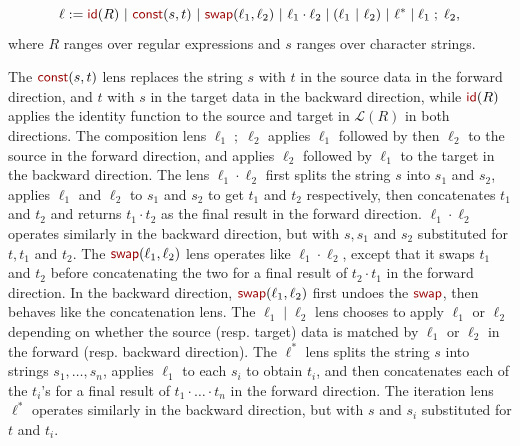 \documentclass[acmsmall,review,anonymous]{acmart}
\newcommand{\kw}[1]{\textcolor{dkred}{\ensuremath{\mathsf{#1}}}}
\newcommand{\sep}{\ensuremath{\ | \ }}
\newcommand{\const}{\ensuremath{\kw{const}}}
\newcommand{\swap}{\ensuremath{\kw{swap}}}
\newcommand{\id}{\ensuremath{\kw{id}}}
\begin{document}
$$\ell := \id(R) \sep \const(s, t) \sep  \swap(\ell_1, \ell_2)
\sep \ell_1 \cdot \ell_2 \; |  \; (\ell_1 \sep \ell_2) \sep \ell^* \; | \;
\ell_1 \; ; \;  \ell_2,$$ where $R$ ranges over regular expressions and $s$
ranges over character strings.

The $\mathit{\const}(s, t)$ lens replaces the string $s$ with $t$ in the source
data in the forward direction, and $t$ with $s$ in the target data in the
backward direction, while $\kw{id}(R)$ applies the identity function to the
source and target  in $\mathcal{L}(R)$ in both directions. The composition lens
$\ell_1 \; ; \; \ell_2$ applies $\ell_1$ followed by then $\ell_2$ to the
source in the forward direction, and applies $\ell_2$ followed by $\ell_1$ to
the target in the backward direction. The lens $\ell_1 \cdot \ell_2$ first
splits the string $s$ into $s_1$ and $s_2$, applies $\ell_1$ and $\ell_2$ to
$s_1$ and $s_2$ to get $t_1$ and $t_2$ respectively, then concatenates $t_1$
and $t_2$ and returns $t_1 \cdot t_2$ as the final result in the forward
direction. $\ell_1 \cdot \ell_2$ operates similarly in the backward direction,
but with $s, s_1$ and $s_2$ substituted for $t, t_1$ and $t_2$. The
$\swap(\ell_1, \ell_2)$ lens operates like $\ell_1 \cdot \ell_2$,
except that it swaps $t_1$ and $t_2$ before concatenating the two for a final
result of $t_2 \cdot t_1$ in the forward direction. In the backward direction,
$\swap(\ell_1, \ell_2)$ first undoes the \swap, then behaves like
the concatenation lens. The $\ell_1 \; | \; \ell_2$ lens chooses to apply
$\ell_1$ or $\ell_2$ depending on whether the source (resp. target) data is
matched by $\ell_1$ or $\ell_2$ in the forward (resp. backward direction). The
$\ell^*$ lens splits the string $s$ into strings $s_1, \ldots, s_n$, applies
$\ell_1$ to each $s_i$ to obtain $t_i$, and then concatenates each of the $t_i$'s
for a final result of $t_1 \cdot \ldots \cdot t_n$ in the forward direction.
The iteration lens $\ell^*$ operates similarly in the backward direction, but
with $s$ and $s_i$ substituted for $t$ and $t_i$.
\end{document}
